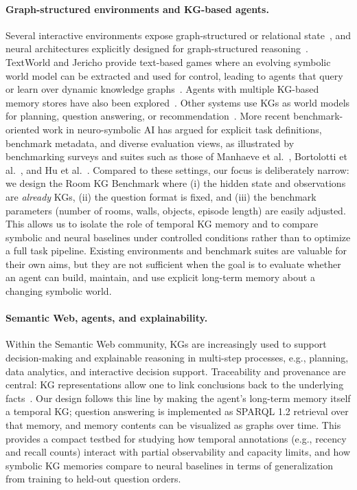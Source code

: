 \documentclass[Afour,sageh,times]{sagej}
\begin{document}
\paragraph{Graph-structured environments and KG-based agents.}
Several interactive environments expose graph-structured or relational
state~\citep{chaplot2020neuraltopologicalslamvisual}, and neural architectures explicitly
designed for graph-structured reasoning~\citep{yun2020graphtransformernetworks}.
TextWorld and Jericho provide text-based games where an evolving symbolic world model
can be extracted and used for control, leading to agents that query or learn over
dynamic knowledge
graphs~\citep{Cote2018TextWorld,Hausknecht2020Jericho,Ammanabrolu2020Graph,oh2017valuepredictionnetwork}.
Agents with multiple KG-based memory stores have also been
explored~\citep{10.1609/aaai.v37i1.25075}. Other systems use KGs as world models for
planning, question answering, or
recommendation~\citep{Hogan_2021,ehrlinger2016towards,bordes2015largescalesimplequestionanswering,yih-etal-2015-semantic}.
More recent benchmark-oriented work in neuro-symbolic AI has argued for explicit task
definitions, benchmark metadata, and diverse evaluation views, as illustrated by
benchmarking surveys and suites such as those of Manhaeve et al.~\citep{Manhaeve2025BenchmarkingNeSy},
Bortolotti et al.~\citep{Bortolotti2024RSBench}, and Hu et al.~\citep{Hu2025Text2World}.
Compared to these settings, our focus is deliberately narrow: we design the Room
KG Benchmark where (i) the hidden state and observations are \emph{already} KGs, (ii)
the question format is fixed, and (iii) the benchmark parameters (number of rooms,
walls, objects, episode length) are easily adjusted. This allows us to isolate the role
of temporal KG memory and to compare symbolic and neural baselines under controlled
conditions rather than to optimize a full task pipeline. Existing environments and
benchmark suites are valuable for their own aims, but they are not sufficient when the
goal is to evaluate whether an agent can build, maintain, and use explicit long-term
memory about a changing symbolic world.

\paragraph{Semantic Web, agents, and explainability.}
Within the Semantic Web community, KGs are increasingly used to support decision-making
and explainable reasoning in multi-step processes, e.g., planning, data analytics, and
interactive decision support. Traceability and provenance are central: KG
representations allow one to link conclusions back to the underlying
facts~\citep{anyanwu2003rho}. Our design follows this line by making the agent’s
long-term memory itself a temporal KG; question answering is implemented as
SPARQL 1.2 retrieval over that memory, and memory contents can be visualized as
graphs over time. This provides a compact testbed for studying how temporal annotations
(e.g., recency and recall counts) interact with partial observability and capacity
limits, and how symbolic KG memories compare to neural baselines in terms of
generalization from training to held-out question orders.
\end{document}

